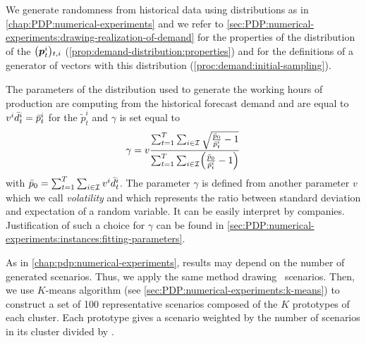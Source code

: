 We generate randomness from historical data using \distrib distributions as in \cref{chap:PDP:numerical-experiments} and we refer to \cref{sec:PDP:numerical-experiments:drawing-realization-of-demand} for the properties of the distribution of the $\bracket{\va p_t^i}_{t,i}$ (\cref{prop:demand-distribution:properties}) and for the definitions of a generator of vectors with this distribution (\cref{proc:demand:initial-sampling}).


The parameters of the \distrib distribution used to generate the working hours of production are computing from the historical forecast demand and are equal to $v^i\bar{d}_t^i=\bar{p}_t^i$ for the $\tilde{p}_t^i$ and $\gamma$ is set equal to
\begin{equation}
  \gamma
  =
  v\frac
  {\sum_{t=1}^{\horizon}\sum_{i\in\REF} \sqrt{\frac{\bar{p}_0}{\bar{p}_t^i}-1}}
  {\sum_{t=1}^{\horizon}\sum_{i\in\REF} \bracket{\frac{\bar{p}_0}{\bar{p}_t^i}-1}}
\end{equation}
with $\bar{p}_0 = \sum_{t=1}^{T}\sum_{i\in\mathcal{I}}v^i\bar{d}_t^i$.
The parameter $\gamma$ is defined from another parameter $v$ which we call \emph{volatility} and which represents the ratio between standard deviation and expectation of a random variable.
It can be easily interpret by companies.
Justification of such a choice for $\gamma$ can be found in \cref{sec:PDP:numerical-experiments:instances:fitting-parameters}.



\medskip


As in \cref{chap:pdp:numerical-experiments}, results may depend on the number of generated scenarios.
Thus, we apply the same method drawing \tbc\ scenarios.
Then, we use $K$-means algorithm (see \cref{sec:PDP:numerical-experiments:k-means}) to construct a set of 100 representative scenarios composed of the $K$ prototypes of each cluster.
Each prototype gives a scenario weighted by the number of scenarios in its cluster divided by \tbc.




